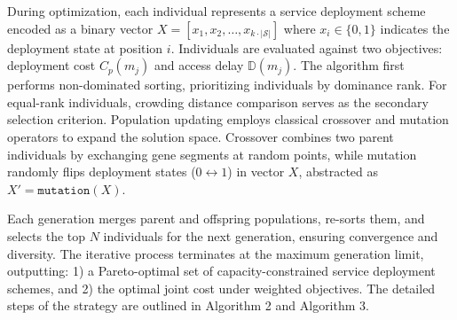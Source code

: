 \documentclass[10pt, conference, letterpaper]{IEEEtran}
\begin{document}
During optimization, each individual represents a service deployment scheme encoded as a binary vector $X = [x_1, x_2, \dots, x_{k \cdot |\mathcal{S}|}]$ where $x_i \in \{0,1\}$ indicates the deployment state at position $i$. Individuals are evaluated against two objectives: deployment cost $C_p(m_j)$ and access delay $\mathbb{D}(m_j)$. The algorithm first performs non-dominated sorting, prioritizing individuals by dominance rank. For equal-rank individuals, crowding distance comparison serves as the secondary selection criterion. Population updating employs classical crossover and mutation operators to expand the solution space. Crossover combines two parent individuals by exchanging gene segments at random points, while mutation randomly flips deployment states ($0 \leftrightarrow 1$) in vector $X$, abstracted as $X'= \texttt{mutation} (X)$. 

Each generation merges parent and offspring populations, re-sorts them, and selects the top $N$ individuals for the next generation, ensuring convergence and diversity. The iterative process terminates at the maximum generation limit, outputting: 1) a Pareto-optimal set of capacity-constrained service deployment schemes, and 2) the optimal joint cost under weighted objectives. The detailed steps of the strategy are outlined in Algorithm 2 and Algorithm 3.


\end{document}
